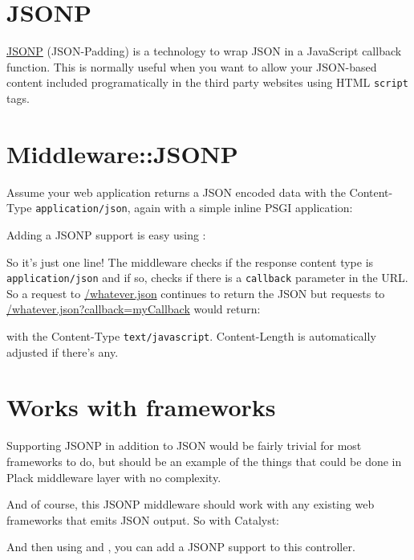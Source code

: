 \section{JSONP}\label{jsonp}

\href{http://ajaxian.com/archives/jsonp-json-with-padding}{JSONP}
(JSON-Padding) is a technology to wrap JSON in a JavaScript callback
function. This is normally useful when you want to allow your JSON-based
content included programatically in the third party websites using HTML
\lstinline!script! tags.

\section{Middleware::JSONP}\label{middlewarejsonp}

Assume your web application returns a JSON encoded data with the
Content-Type \lstinline!application/json!, again with a simple inline
PSGI application:


Adding a JSONP support is easy using :


So it's just one line! The middleware checks if the response content
type is \lstinline!application/json! and if so, checks if there is a
\lstinline!callback! parameter in the URL. So a request to
\url{/whatever.json} continues to return the JSON but requests to
\url{/whatever.json?callback=myCallback} would return:

%
with the Content-Type \lstinline!text/javascript!. Content-Length is
automatically adjusted if there's any.

\section{Works with frameworks}\label{works-with-frameworks}

Supporting JSONP in addition to JSON would be fairly trivial for most
frameworks to do, but  should be an example of the
things that could be done in Plack middleware layer with no complexity.

And of course, this JSONP middleware should work with any existing web
frameworks that emits JSON output. So with Catalyst:


And then using  and , you can add a
JSONP support to this controller.

